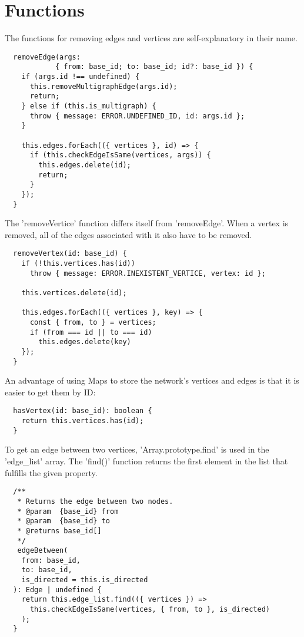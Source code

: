 \chapter{Functions}

The functions for removing edges and vertices are self-explanatory in their name.

\begin{verbatim}
  removeEdge(args:
            { from: base_id; to: base_id; id?: base_id }) {
    if (args.id !== undefined) {
      this.removeMultigraphEdge(args.id);
      return;
    } else if (this.is_multigraph) {
      throw { message: ERROR.UNDEFINED_ID, id: args.id };
    }

    this.edges.forEach(({ vertices }, id) => {
      if (this.checkEdgeIsSame(vertices, args)) {
        this.edges.delete(id);
        return;
      }
    });
  }
\end{verbatim}

The 'removeVertice' function differs itself from 'removeEdge'.
When a vertex is removed, all of the edges associated with it also have to be removed.

\begin{verbatim}
  removeVertex(id: base_id) {
    if (!this.vertices.has(id))
      throw { message: ERROR.INEXISTENT_VERTICE, vertex: id };

    this.vertices.delete(id);

    this.edges.forEach(({ vertices }, key) => {
      const { from, to } = vertices;
      if (from === id || to === id)
        this.edges.delete(key)
    });
  }
\end{verbatim}

An advantage of using Maps to store the network's vertices and edges is that it is easier to get them by ID:

\begin{verbatim}
  hasVertex(id: base_id): boolean {
    return this.vertices.has(id);
  }
\end{verbatim}

To get an edge between two vertices, 'Array.prototype.find' is used in the 'edge\_list' array.
The 'find()' function returns the first element in the list that fulfills the given property.

\begin{verbatim}
  /**
   * Returns the edge between two nodes.
   * @param  {base_id} from
   * @param  {base_id} to
   * @returns base_id[]
   */
   edgeBetween(
    from: base_id,
    to: base_id,
    is_directed = this.is_directed
  ): Edge | undefined {
    return this.edge_list.find(({ vertices }) =>
      this.checkEdgeIsSame(vertices, { from, to }, is_directed)
    );
  }
\end{verbatim}

